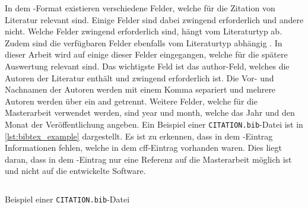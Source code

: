 In dem -Format existieren verschiedene Felder, welche für die Zitation von Literatur relevant sind.
Einige Felder sind dabei zwingend erforderlich und andere nicht.
Welche Felder zwingend erforderlich sind, hängt vom Literaturtyp ab.
Zudem sind die verfügbaren Felder ebenfalls vom Literaturtyp abhängig \autocite{patashnik_bibtexing_1988}.
In dieser Arbeit wird auf einige dieser Felder eingegangen, welche für die spätere Auswertung relevant sind.
Das wichtigste Feld ist das \glqq author\grqq{}-Feld, welches die Autoren der Literatur enthält und zwingend erforderlich ist.
Die Vor- und Nachnamen der Autoren werden mit einem Komma separiert und mehrere Autoren werden über ein \glqq and\grqq{} getrennt.
Weitere Felder, welche für die Masterarbeit verwendet werden, sind \glqq year\grqq{} und \glqq month\grqq{}, welche das Jahr und den Monat der Veröffentlichung angeben.
Ein Beispiel einer \texttt{CITATION.bib}-Datei ist in \autoref{lst:bibtex_example} dargestellt.
Es ist zu erkennen, dass in dem -Eintrag Informationen fehlen, welche in dem \gls{cff}-Eintrag vorhanden waren.
Dies liegt daran, dass in dem -Eintrag nur eine Referenz auf die Masterarbeit möglich ist und nicht auf die entwickelte Software.

\begin{listing}
  \inputminted{text}{../CITATION.bib}
  \caption{Beispiel einer \texttt{CITATION.bib}-Datei}
  \label{lst:bibtex_example}
\end{listing}
